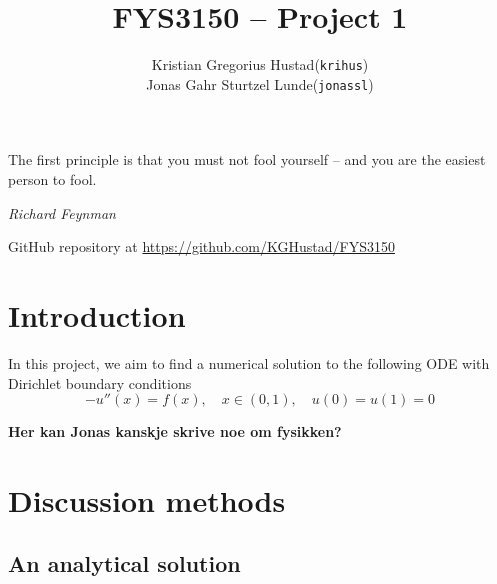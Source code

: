 \documentclass[a4paper]{article}
\begin{document}
\title{FYS3150 -- Project 1}
\author{
    \begin{tabular}{r l}
        Kristian Gregorius Hustad & (\texttt{krihus})\\
        Jonas Gahr Sturtzel Lunde & (\texttt{jonassl})
    \end{tabular}}

\maketitle

\setlength{\epigraphwidth}{0.7\textwidth}
\renewcommand{\epigraphflush}{center}
\renewcommand{\beforeepigraphskip}{70pt}
\renewcommand{\epigraphsize}{\normalsize}
\epigraph{The first principle is that you must not fool yourself -- and you are the easiest person to fool.}{\textit{Richard Feynman}}

\vfill

\begin{center}
    GitHub repository at \url{https://github.com/KGHustad/FYS3150}
\end{center}

\newpage

\newcommand{\half}{\frac{1}{2}}
\newcommand{\dx}{{\Delta x}}


\section{Introduction}

In this project, we aim to find a numerical solution to the following ODE with Dirichlet boundary conditions
\begin{equation}
    -u''(x) = f(x), \quad x\in(0,1), \quad u(0) = u(1) = 0
    \label{eq:ddu_dxx_cont}
\end{equation}

\textbf{Her kan Jonas kanskje skrive noe om fysikken?}

\section{Discussion methods}
\subsection{An analytical solution}
\end{document}
